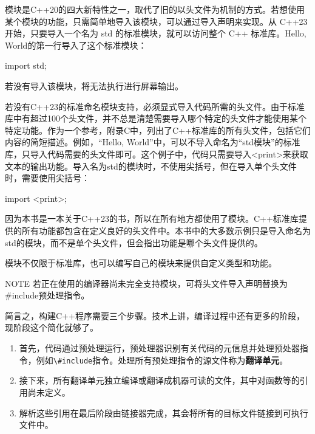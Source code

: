 
模块是C++20的四大新特性之一，取代了旧的以头文件为机制的方式。若想使用某个模块的功能，只需简单地导入该模块，可以通过导入声明来实现。从 C++23 开始，只要导入一个名为 std 的标准模块，就可以访问整个 C++ 标准库。Hello, World的第一行导入了这个标准模块：

\begin{cpp}
import std;
\end{cpp}

若没有导入该模块，将无法执行进行屏幕输出。

若没有C++23的标准命名模块支持，必须显式导入代码所需的头文件。由于标准库中有超过100个头文件，并不总是清楚需要导入哪个特定的头文件才能使用某个特定功能。作为一个参考，附录C中，列出了C++标准库的所有头文件，包括它们内容的简短描述。例如，“Hello, World”中，可以不导入命名为“std模块”的标准库，只导入代码需要的头文件即可。这个例子中，代码只需要导入<print>来获取文本的输出功能。导入名为std的模块时，不使用尖括号，但在导入单个头文件时，需要使用尖括号：

\begin{cpp}
import <print>;
\end{cpp}

因为本书是一本关于C++23的书，所以在所有地方都使用了模块。C++标准库提供的所有功能都包含在定义良好的头文件中。本书中的大多数示例只是导入命名为std的模块，而不是单个头文件，但会指出功能是哪个头文件提供的。

模块不仅限于标准库，也可以编写自己的模块来提供自定义类型和功能。

\begin{myNotic}{NOTE}
若正在使用的编译器尚未完全支持模块，可将头文件导入声明替换为\#include预处理指令。
\end{myNotic}


简言之，构建C++程序需要三个步骤。技术上讲，编译过程中还有更多的阶段，现阶段这个简化就够了。

\begin{enumerate}
\item
首先，代码通过预处理运行，预处理器识别有关代码的元信息并处理预处器指令，例如\verb|\#include|指令。处理所有预处理指令的源文件称为\textbf{翻译单元}。

\item
接下来，所有翻译单元独立编译或翻译成机器可读的文件，其中对函数等的引用尚未定义。

\item
解析这些引用在最后阶段由链接器完成，其会将所有的目标文件链接到可执行文件中。
\end{enumerate}

